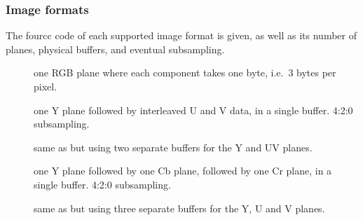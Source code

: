 \subsubsection{Image formats}\label{sec:Device Types / Video Device / Supported formats / Image formats}

The fourcc code of each supported image format is given, as well as its
number of planes, physical buffers, and eventual subsampling.

\begin{description}
\item[]
one RGB plane where each component takes one byte, i.e.~3 bytes per
pixel.
\item[]
one Y plane followed by interleaved U and V data, in a single buffer.
4:2:0 subsampling.
\item[]
same as  but using two separate buffers for the Y and UV
planes.
\item[]
one Y plane followed by one Cb plane, followed by one Cr plane, in a
single buffer. 4:2:0 subsampling.
\item[]
same as  but using three separate buffers for the Y, U and V
planes.
\end{description}
